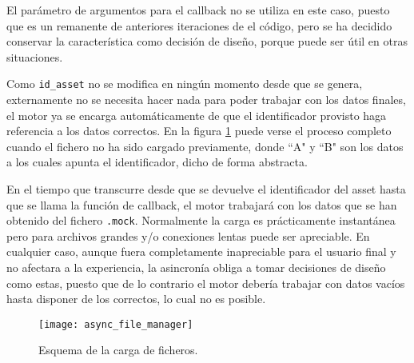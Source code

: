 El parámetro de argumentos para el callback no se utiliza en este caso, puesto que es un remanente de anteriores iteraciones de el código, pero se ha decidido conservar la característica como decisión de diseño, porque puede ser útil en otras situaciones.

Como \texttt{id\_asset} no se modifica en ningún momento desde que se genera, externamente no se necesita hacer nada para poder trabajar con los datos finales, el motor ya se encarga automáticamente de que el identificador provisto haga referencia a los datos correctos. En la figura \ref{fig:async_file_manager} puede verse el proceso completo cuando el fichero no ha sido cargado previamente, donde ``A" y ``B" son los datos a los cuales apunta el identificador, dicho de forma abstracta.

En el tiempo que transcurre desde que se devuelve el identificador del asset hasta que se llama la función de callback, el motor trabajará con los datos que se han obtenido del fichero \texttt{.mock}. Normalmente la carga es prácticamente instantánea pero para archivos grandes y/o conexiones lentas puede ser apreciable. En cualquier caso, aunque fuera completamente inapreciable para el usuario final y no afectara a la experiencia, la asincronía obliga a tomar decisiones de diseño como estas, puesto que de lo contrario el motor debería trabajar con datos vacíos hasta disponer de los correctos, lo cual no es posible.

\begin{figure}[H]
    \centering
    \texttt{[image: async\_file\_manager]}
    \caption{Esquema de la carga de ficheros.}
    \label{fig:async_file_manager}
\end{figure}
